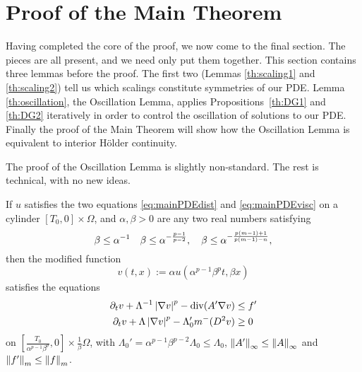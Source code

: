 \section{Proof of the Main Theorem} \label{sec:main}

Having completed the core of the proof, we now come to the final section.  The pieces are all present, and we need only put them together.  This section contains three lemmas before the proof.  The first two (Lemmas \ref{th:scaling1} and \ref{th:scaling2}) tell us which scalings constitute symmetries of our PDE.  Lemma \ref{th:oscillation}, the Oscillation Lemma, applies Propositions~\ref{th:DG1} and \ref{th:DG2} iteratively in order to control the oscillation of solutions to our PDE.  Finally the proof of the Main Theorem will show how the Oscillation Lemma is equivalent to interior H\"{o}lder continuity.  

The proof of the Oscillation Lemma is slightly non-standard.  The rest is technical, with no new ideas.  

\begin{lemma} \label{th:scaling1}
 If $u$ satisfies the two equations \eqref{eq:mainPDEdist} and \eqref{eq:mainPDEvisc} on a cylinder $[T_0,0]\times\Omega$, and $\alpha,\beta > 0$ are any two real numbers satisfying 
\[ \beta \leq \alpha^{-1} \quad \beta \leq \alpha^{-\frac{p-1}{p-2}}, \quad \beta \leq \alpha^{-\frac{p(m-1)+1}{p(m-1) - n} } , \]
then the modified function 
\[ v(t,x) := \alpha u(\alpha^{p-1}\beta^p t, \beta x)\] 
satisfies the equations
\begin{align*}
\partial_t v + \Lambda^{-1} \left\lvert \nabla v \right\rvert^p - \operatorname{div}(A' \nabla v) &\leq f' \\
\partial_t v + \Lambda \left\lvert \nabla v \right\rvert^p - \Lambda_0' m^-(D^2 v)  &\geq 0
\end{align*}
on $\left[ \frac{T_0}{\alpha^{p-1}\beta^p},0\right] \times \frac{1}{\beta} \Omega$, with $\Lambda_0' = \alpha^{p-1}\beta^{p-2} \Lambda_0 \leq \Lambda_0$, $\left\lVert A'\right\rVert_\infty \leq \left\lVert A\right\rVert_\infty$ and $\left\lVert f'\right\rVert_m \leq \left\lVert f\right\rVert_m$.
\end{lemma}

